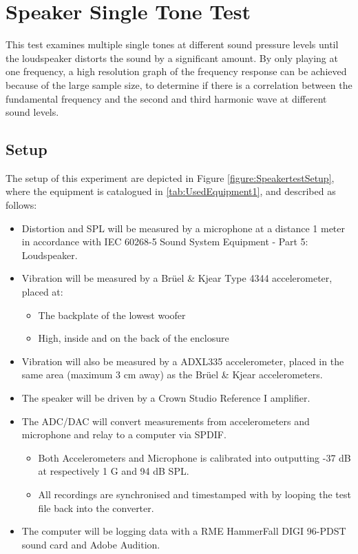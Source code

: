 \chapter{Speaker Single Tone Test} \label{app:journal_speaker_test2}

This test examines multiple single tones at different sound pressure levels until the loudspeaker distorts the sound by a significant amount. By only playing at one frequency, a high resolution graph of the frequency response can be achieved because of the large sample size, to determine if there is a correlation between the fundamental frequency and the second and third harmonic wave at different sound levels.


\section{Setup}

The setup of this experiment are depicted in Figure \ref{figure:SpeakertestSetup}, where the equipment is catalogued in \autoref{tab:UsedEquipment1}, and described as follows:

\begin{itemize}
\item Distortion and \gls{SPL} will be measured by a microphone at a distance 1 meter in accordance with IEC 60268-5 Sound System Equipment - Part 5: Loudspeaker.
\item Vibration will be measured by a Brüel \& Kjear Type 4344 accelerometer, placed at:
\begin{itemize}
\item The backplate of the lowest woofer
\item High, inside and on the back of the enclosure 
\end{itemize}
\item Vibration will also be measured by a ADXL335 accelerometer, placed in the same area (maximum 3 cm away) as the Brüel \& Kjear accelerometers. 
\item The speaker will be driven by a Crown Studio Reference I amplifier.
\item The ADC/DAC will convert measurements from accelerometers and microphone and relay to a computer via SPDIF.
\begin{itemize}
\item Both Accelerometers and Microphone is calibrated into outputting -37 dB at respectively 1 G and 94 dB \gls{SPL}.
\item All recordings are synchronised and timestamped with by looping the test file back into the converter.
\end{itemize}
\item The computer will be logging data with a RME HammerFall DIGI 96-PDST sound card and Adobe Audition.
\end{itemize}

